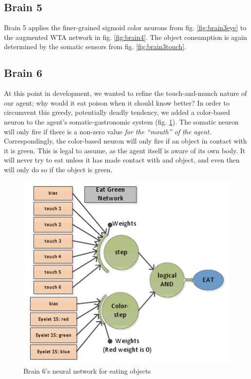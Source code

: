 \subsection{Brain 5}
Brain 5 applies the finer-grained sigmoid color neurons from 
fig. \ref{fig:brain3eye} to the augmented WTA network in 
fig. \ref{fig:brain4}. The object consumption is again determined by the 
somatic sensors from fig. \ref{fig:brain3touch}.

\subsection{Brain 6}
At this point in development, we wanted to refine the touch-and-munch nature
of our agent; why would it eat poison when it should know better? In order
to circumvent this greedy, potentially deadly tendency, we added a
color-based neuron to the agent's somatic-gastronomic system 
(fig. \ref{fig:brain6}). The somatic neuron will only fire if there is a
non-zero value \emph{for the ``mouth'' of the agent}. Correspondingly, the
color-based neuron will only fire if an object in contact with it is green.
This is legal to assume, as the agent itself is aware of its own body. It will
never try to eat unless it has made contact with and object, and even then
will only do so if the object is green.

\begin{figure}
\begin{center}
  \includegraphics[scale=.7]{img/brain6.png}
  \caption{Brain 6's neural network for eating objects}
  \label{fig:brain6}
\end{center}
\end{figure}

